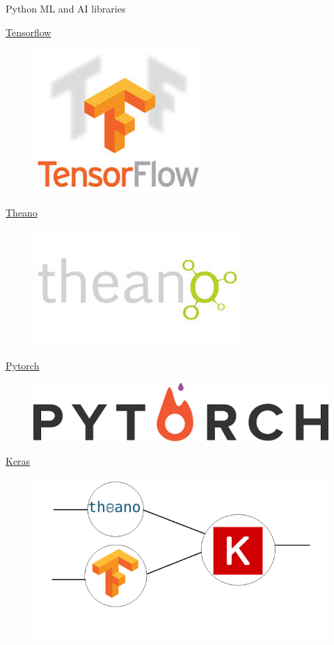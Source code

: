 \documentclass{bredelebeamer}
\begin{document}
\begin{frame}{Python ML and AI libraries}
\begin{multicols}{3}
\href{https://www.tensorflow.org/}{Tensorflow}
\begin{figure}[h]
\includegraphics[scale=0.3]{../image/tf.jpg}
\end{figure} 
\href{http://deeplearning.net/software/theano/}{Theano}
\begin{figure}[h]
\includegraphics[scale=0.3]{../image/theano.jpg}
\end{figure}
\href{http://pytorch.org/}{Pytorch}
\begin{figure}[h]
\includegraphics[scale=0.2]{../image/pytorch.png}
\end{figure}
\href{https://keras.io/}{Keras}
\begin{figure}[h]
\includegraphics[scale=0.3]{../image/keras.png}

\end{figure}
\end{multicols}
\end{frame}
\end{document}
